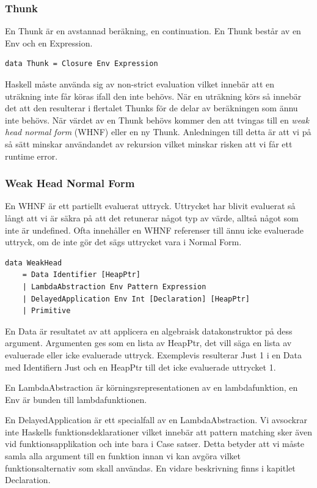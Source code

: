 \subsubsection{Thunk}
En Thunk är en avstannad beräkning, en continuation. En Thunk består av en Env och en Expression.

\begin{lstlisting}
data Thunk = Closure Env Expression
\end{lstlisting}

Haskell måste använda sig av non-strict evaluation vilket innebär att en uträkning inte får köras ifall den inte behövs. När en uträkning körs så innebär det att den resulterar i flertalet Thunks för de delar av beräkningen som ännu inte behövs. När värdet av en Thunk behövs kommer den att tvingas till en \emph{weak head normal form} (WHNF) eller en ny Thunk. Anledningen till detta är att vi på så sätt minskar användandet av rekursion vilket minskar risken att vi får ett runtime error.

\subsubsection{Weak Head Normal Form}
En WHNF är ett partiellt evaluerat uttryck. Uttrycket har blivit evaluerat så långt att vi är säkra på att det retunerar något typ av värde, alltså något som inte är undefined. Ofta innehåller en WHNF referenser till ännu icke evaluerade uttryck, om de inte gör det sägs uttrycket vara i Normal Form.

\begin{lstlisting}
data WeakHead 
    = Data Identifier [HeapPtr]
    | LambdaAbstraction Env Pattern Expression
    | DelayedApplication Env Int [Declaration] [HeapPtr]
    | Primitive
\end{lstlisting}

En Data är resultatet av att applicera en algebraisk datakonstruktor på dess argument. Argumenten ges som en lista av HeapPtr, det vill säga en lista av evaluerade eller icke evaluerade uttryck. Exemplevis resulterar Just 1 i en Data med Identifiern Just och en HeapPtr till det icke evaluerade uttrycket 1.

En LambdaAbstraction är körningsrepresentationen av en lambdafunktion, en Env är bunden till lambdafunktionen.

En DelayedApplication är ett specialfall av en LambdaAbstraction. Vi avsockrar inte Haskells funktionsdeklarationer vilket innebär att pattern matching sker även vid funktionsapplikation och inte bara i Case satser. Detta betyder att vi måste samla alla argument till en funktion innan vi kan avgöra vilket funktionsalternativ som skall användas. En vidare beskrivning finns i kapitlet Declaration.

